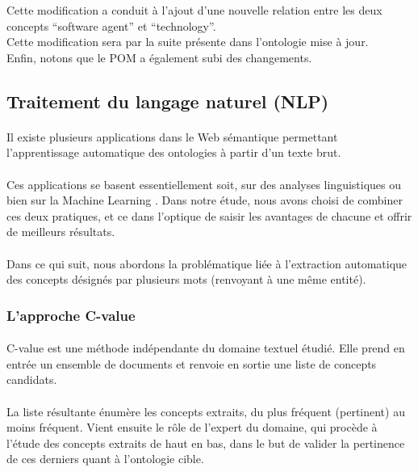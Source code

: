 \documentclass[12pt, a4paper, oneside]{book}
\begin{document}
Cette modification a conduit à l'ajout d'une nouvelle relation entre les deux concepts “software agent” et “technology”.\\


Cette modification sera par la suite présente dans l'ontologie mise à jour.\\
Enfin, notons que le POM a également subi des changements.


\subsection{Traitement du langage naturel (NLP)}
\paragraph{}
Il existe plusieurs applications dans le Web sémantique permettant l'apprentissage automatique des ontologies à partir d'un texte brut.
\paragraph{}
Ces applications se basent essentiellement soit, sur des analyses linguistiques\citep{lin} ou bien sur la Machine Learning \citep{ML}.
Dans notre étude, nous avons choisi de combiner ces deux pratiques, et ce dans l'optique de saisir les avantages de chacune et offrir de meilleurs résultats.\citep{nlp}
\paragraph{}
Dans ce qui suit, nous abordons la problématique liée à l'extraction automatique des concepts désignés par plusieurs mots (renvoyant à une même entité).


\subsubsection{L'approche C-value}
\paragraph{}
C-value est une méthode indépendante du domaine textuel étudié. Elle prend en entrée un ensemble de documents et renvoie en sortie une liste de concepts candidats.
\paragraph{}
La liste résultante énumère les concepts extraits, du plus fréquent (pertinent) au moins fréquent. Vient ensuite le rôle de l'expert du domaine, qui procède à l'étude des concepts extraits de haut en bas, dans le but de valider la pertinence de ces derniers quant à l'ontologie cible.
\end{document}

